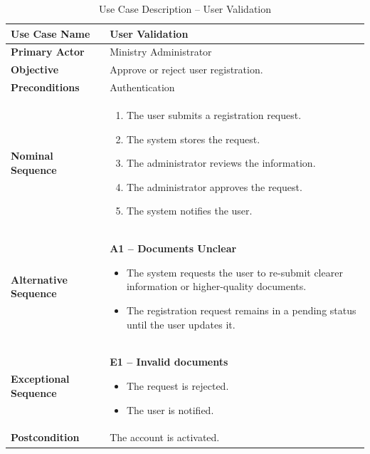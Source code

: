 \begin{table}[H]
	\centering
	\renewcommand{\arraystretch}{1.3}
	\begin{tabular}{|p{4cm}|p{10cm}|}
		\hline
		
		\textbf{Use Case Name} & User Validation \\ 
		\hline
		
		\textbf{Primary Actor} & Ministry Administrator \\ 
		\hline
		
		\textbf{Objective} & Approve or reject user registration. \\ 
		\hline
		
		\textbf{Preconditions} & Authentication \\ 
		\hline
		
		\textbf{Nominal Sequence} &
		\begin{enumerate}
			\item The user submits a registration request.
			\item The system stores the request.
			\item The administrator reviews the information.
			\item The administrator approves the request.
			\item The system notifies the user.
		\end{enumerate} \\ 
		\hline
		
		\textbf{Alternative Sequence} & 
		\textbf{A1 -- Documents Unclear}
		\begin{itemize}
			
			\item The system requests the user to re-submit clearer information or higher-quality documents.
			\item The registration request remains in a pending status until the user updates it.
		\end{itemize} \\ 
		\hline
		
		\textbf{Exceptional Sequence} &
		\textbf{E1 -- Invalid documents}
		\begin{itemize}
			\item The request is rejected.
			\item The user is notified.
		\end{itemize} \\ 
		\hline
		
		\textbf{Postcondition} &
		The account is activated. \\ 
		\hline
		
	\end{tabular}
	\caption{Use Case Description -- User Validation}
\end{table}

